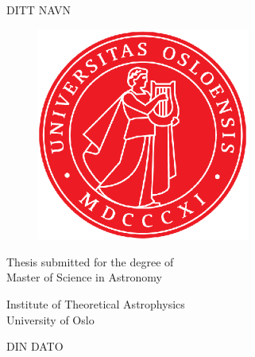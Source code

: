 \begin{titlepage}
\begin{center}

\bfseries
\huge%
\mintittel

\vspace{2cm}
\LARGE
DITT NAVN


\vspace{1cm}
\begin{figure}[h]
\centering
\includegraphics[width=7cm]{uiologo.eps}
\centering
\end{figure}
\vspace{3cm}
\Large
Thesis submitted for the degree of \\
Master of Science in Astronomy%

\vspace{0.8cm}
\large
Institute of Theoretical Astrophysics\\
University of Oslo

\vspace{0.8cm}
DIN DATO

\end{center}
\normalfont

\end{titlepage}
